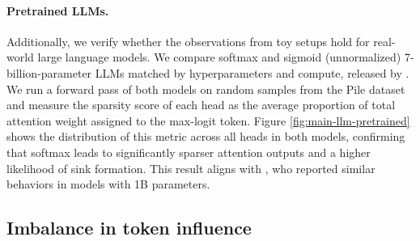 \documentclass{article}
\theoremstyle{plain}
\theoremstyle{definition}
\theoremstyle{remark}
\begin{document}
\paragraph{Pretrained LLMs.}
Additionally, we verify whether the observations from toy setups hold for real-world large language models. We compare softmax and sigmoid (unnormalized) 7-billion-parameter LLMs matched by hyperparameters and compute, released by \citet{ramapuramtheory}. We run a forward pass of both models on random samples from the Pile dataset \cite{gao2020pile} and measure the sparsity score of each head as the average proportion of total attention weight assigned to the max-logit token. Figure \ref{fig:main-llm-pretrained} shows the distribution of this metric across all heads in both models, confirming that softmax leads to significantly sparser attention outputs and a higher likelihood of sink formation. This result aligns with \citet{gu2025when}, who reported similar behaviors in models with 1B parameters.


\subsection{Imbalance in token influence}

\end{document}
